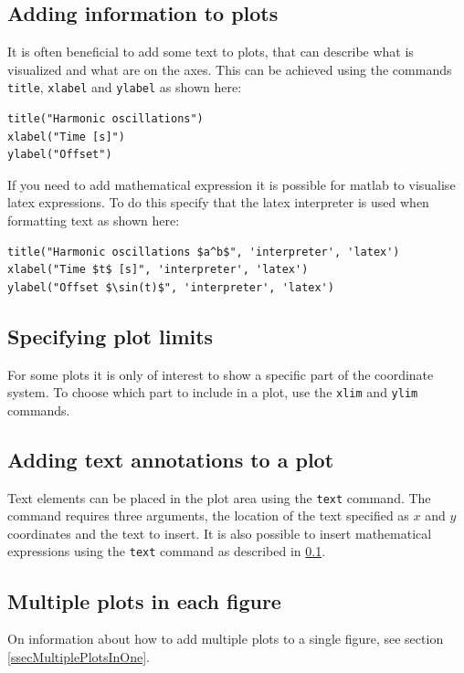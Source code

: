 \subsection{Adding information to plots}
\label{ssecAddingInformationToPlots}

It is often beneficial to add some text to plots, 
that can describe what is visualized and what are on the 
axes. 
This can be achieved using the commands \verb!title!, 
\verb!xlabel! and \verb!ylabel! as shown here:
\begin{lstlisting}
title("Harmonic oscillations")
xlabel("Time [s]")
ylabel("Offset")
\end{lstlisting}

If you need to add mathematical expression it is possible 
for matlab to visualise latex expressions.
To do this specify that the latex interpreter is used when 
formatting text as shown here:
\begin{lstlisting}
title("Harmonic oscillations $a^b$", 'interpreter', 'latex')
xlabel("Time $t$ [s]", 'interpreter', 'latex')
ylabel("Offset $\sin(t)$", 'interpreter', 'latex')
\end{lstlisting}


\subsection{Specifying plot limits}

For some plots it is only of interest to show a specific 
part of the coordinate system.
To choose which part to include in a plot, use the 
\verb!xlim! and \verb!ylim! commands.


\subsection{Adding text annotations to a plot}

Text elements can be placed in the plot area
using the \verb!text! command.
The command requires three arguments, the location of the 
text specified as $x$ and $y$ coordinates and the 
text to insert.
It is also possible to insert mathematical expressions
using the \verb!text! command as described in 
\ref{ssecAddingInformationToPlots}.


\subsection{Multiple plots in each figure}

On information about how to add multiple
plots to a single figure, see section 
\ref{ssecMultiplePlotsInOne}.


